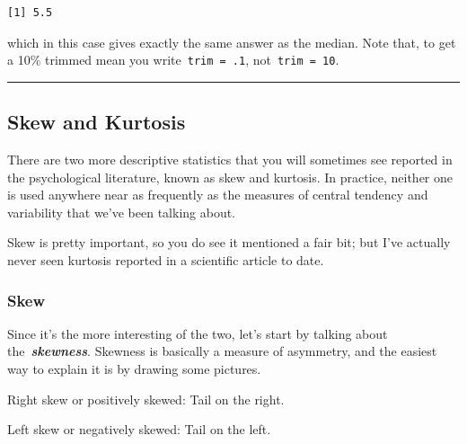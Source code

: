\documentclass[
  letterpaper,
  DIV=11,
  numbers=noendperiod]{scrartcl}
\begin{document}
\begin{verbatim}
[1] 5.5
\end{verbatim}

which in this case gives exactly the same answer as the median. Note
that, to get a 10\% trimmed mean you write~\texttt{trim\ =\ .1},
not~\texttt{trim\ =\ 10}.

\begin{center}\rule{0.5\linewidth}{0.5pt}\end{center}

\subsection{Skew and Kurtosis}\label{skew-and-kurtosis}

There are two more descriptive statistics that you will sometimes see
reported in the psychological literature, known as skew and kurtosis. In
practice, neither one is used anywhere near as frequently as the
measures of central tendency and variability that we've been talking
about.

Skew is pretty important, so you do see it mentioned a fair bit; but
I've actually never seen kurtosis reported in a scientific article to
date.

\subsubsection{Skew}\label{skew}

Since it's the more interesting of the two, let's start by talking about
the~\textbf{\emph{skewness}}. Skewness is basically a measure of
asymmetry, and the easiest way to explain it is by drawing some
pictures.~

Right skew or positively skewed: Tail on the right.

Left skew or negatively skewed: Tail on the left.
\end{document}
